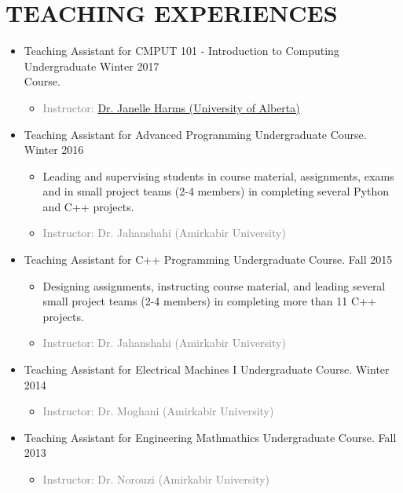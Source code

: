 \documentclass[10pt,a4paper,sans]{moderncv} %
\begin{document}
\section{TEACHING EXPERIENCES}

\begin{itemize}
	
	\item {} Teaching Assistant for CMPUT 101 - Introduction to Computing Undergraduate  \hfill Winter 2017
	\\ Course.
	\begin{itemize} 
		\item\textcolor{gray}{Instructor: \href{https://webdocs.cs.ualberta.ca/~harms/}{Dr. Janelle Harms (University of Alberta)}}
	\end{itemize}
		
	\item {} Teaching Assistant for Advanced Programming Undergraduate Course. \hfill Winter 2016
	\begin{itemize} 
		\item Leading and supervising students in course material, assignments, exams and in small project teams (2-4 members) in completing several Python and C++ projects.
		\item\textcolor{gray}{Instructor: Dr. Jahanshahi (Amirkabir University)}
	\end{itemize}
	
	\item {} Teaching Assistant for C++ Programming Undergraduate Course. \hfill Fall 2015
	\begin{itemize} 
		\item Designing assignments, instructing course material, and leading several small project teams (2-4 members) in completing more than 11 C++ projects.
		\item \textcolor{gray}{Instructor: Dr. Jahanshahi (Amirkabir University)}
	\end{itemize}
	
	\item {} Teaching Assistant for Electrical Machines I Undergraduate Course. \hfill Winter 2014
	\begin{itemize} 
		\item \textcolor{gray}{Instructor: Dr. Moghani (Amirkabir University)}
	\end{itemize}
	
	\item {} Teaching Assistant for Engineering Mathmathics Undergraduate Course. \hfill Fall 2013
	\begin{itemize} 
		\item\textcolor{gray}{Instructor: Dr. Norouzi (Amirkabir University)} 
	\end{itemize}

\end{itemize}
\end{document}
